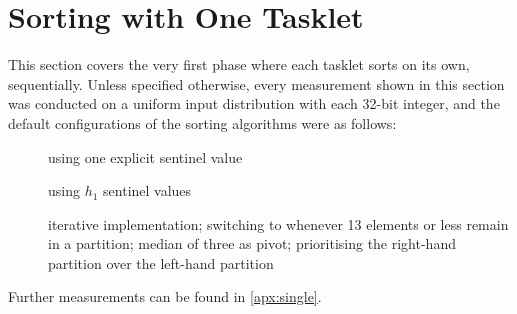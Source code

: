 \section{Sorting with One Tasklet}

This section covers the very first phase where each tasklet sorts on its own, \ie{} sequentially.
Unless specified otherwise, every measurement shown in this section was conducted on a uniform input distribution with each 32-bit integer, and the default configurations of the sorting algorithms were as follows:
\begin{description}
	\item[\IS{}]
	using one explicit sentinel value

	\item[\ShS{}]
	using \(h_1\) sentinel values

	\item[\QS{}]
	iterative implementation;
	switching to \IS{} whenever 13 elements or less remain in a partition;
	median of three as pivot;
	prioritising the right-hand partition over the left-hand partition
\end{description}
Further measurements can be found in \cref{apx:single}.





